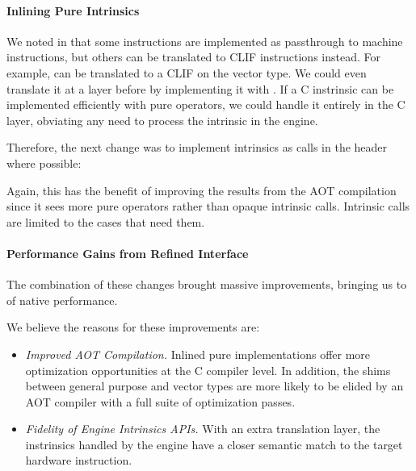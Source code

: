 \newcommand{\changeinline}{Inlining Pure \wasm Intrinsics}
\paragraph{\changeinline}

We noted in  that some instructions are implemented as
passthrough to machine instructions, but others can be translated to CLIF
instructions instead. For example,  can be translated to a CLIF
 on the  vector type.  We could even translate it at a
layer before by implementing it with \wasm {}. If a C instrinsic
can be implemented efficiently with pure \wasm operators, we could handle it
entirely in the C layer, obviating any need to process the intrinsic in the engine.

Therefore, the next change was to implement intrinsics as  calls in
the header where possible:
%

Again, this has the benefit of improving the results from the AOT compilation
since it sees more pure \wasm operators rather than opaque intrinsic calls.
Intrinsic calls are limited to the cases that need them.

\paragraph{Performance Gains from Refined Interface}

The combination of these changes brought massive improvements, bringing us to
\MetricInlineWasmtimeHwwasmDivNative of native performance.

\begin{center}

\end{center}

We believe the reasons for these improvements are:
%
\begin{itemize}
    \item \emph{Improved AOT Compilation.}
        Inlined pure \wasm implementations offer more optimization opportunities
        at the C compiler level.  In addition, the shims between general purpose
        and vector types are more likely to be elided by an AOT compiler with a
        full suite of optimization passes.
    \item \emph{Fidelity of Engine Intrinsics APIs.}
        With an extra translation layer, the instrinsics handled by the engine
        have a closer semantic match to the target hardware instruction.
\end{itemize}

